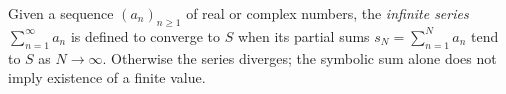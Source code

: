 
Given a sequence $(a_n)_{n\ge1}$ of real or complex numbers, the \emph{infinite series} $\sum_{n=1}^{\infty}a_n$ is defined to converge to $S$ when its partial sums $s_N=\sum_{n=1}^Na_n$ tend to $S$ as $N\to\infty$. Otherwise the series diverges; the symbolic sum alone does not imply existence of a finite value.
